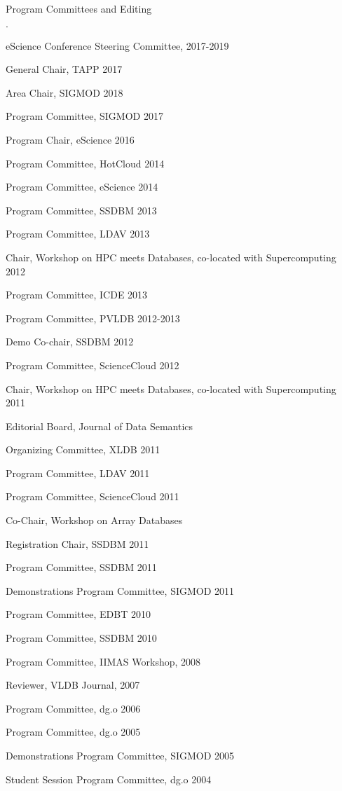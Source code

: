 \documentclass[10pt]{article}
\newenvironment{bulletlist}
   {
      \begin{list}
         {$\cdot$}
         {
            \setlength{\itemsep}{.7ex}
            \setlength{\parsep}{0ex}
            \setlength{\leftmargin}{0.7em}
            \setlength{\parskip}{0ex}
            \setlength{\topsep}{0ex}
         }
   }
   {
      \end{list}
   }
\newcommand{\marginlabel}[1]{
\begin{minipage}[b]{0.8\labelwidth}{\large \textsf{\textbf{#1}}}\end{minipage}}
\newcommand{\entrylabel}[1]{\mbox{\marginlabel{#1}}\hfill}
\newcommand{\MainListlabel}[1]
   {
      \parbox[t]{\labelwidth}{\hspace{.8em}\marginlabel{#1}}
   }
\newenvironment{MainList}[1]
   {
      \renewcommand{\entrylabel}{\MainListlabel}
      \begin{list}{}
      {
         \renewcommand{\makelabel}{\entrylabel}
         \setlength   {\itemindent}{-.65em}
         \setlength   {\labelwidth}{#1}
         \setlength   {\leftmargin}{\labelwidth}
         \setlength   {\itemsep}{3ex}
      }
   }
   {
      \end{list}
   }
\begin{document}
\begin{MainList}{88pt}
\item [Program Committees and Editing]
\begin{bulletlist}
\item eScience Conference Steering Committee, 2017-2019
\item General Chair, TAPP 2017
\item Area Chair, SIGMOD 2018
\item Program Committee, SIGMOD 2017
\item Program Chair, eScience 2016
\item Program Committee, HotCloud 2014
\item Program Committee, eScience 2014
\item Program Committee, SSDBM 2013
\item Program Committee, LDAV 2013
\item Chair, Workshop on HPC meets Databases, co-located with Supercomputing 2012
\item Program Committee, ICDE 2013
\item Program Committee, PVLDB 2012-2013
\item Demo Co-chair, SSDBM 2012
\item Program Committee, ScienceCloud 2012
\item Chair, Workshop on HPC meets Databases, co-located with Supercomputing 2011
\item Editorial Board, Journal of Data Semantics
\item Organizing Committee, XLDB 2011
\item Program Committee, LDAV 2011
\item Program Committee, ScienceCloud 2011
\item Co-Chair, Workshop on Array Databases
\item Registration Chair, SSDBM 2011
\item Program Committee, SSDBM 2011
\item Demonstrations Program Committee, SIGMOD 2011
\item Program Committee, EDBT 2010
\item Program Committee, SSDBM 2010
\item Program Committee, IIMAS Workshop, 2008
\item Reviewer, VLDB Journal, 2007
\item Program Committee, dg.o 2006
\item Program Committee, dg.o 2005
\item Demonstrations Program Committee, SIGMOD 2005
\item Student Session Program Committee, dg.o 2004
\end{bulletlist}



\end{MainList}
\end{document}
